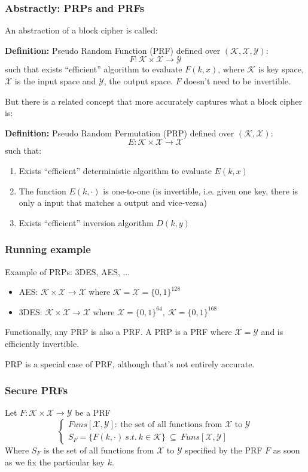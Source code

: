 \documentclass[12pt]{book}
\newcommand{\Def}{\textcolor{dkgreen}{\textbf{Definition:}} }
\begin{document}
\subsubsection{Abstractly: PRPs and PRFs}
An abstraction of a block cipher is called:

\Def Pseudo Random Function (PRF) defined over $(\mathcal{K},\mathcal{X},\mathcal{Y})$:
$$F:\mathcal{K}\times\mathcal{X}\rightarrow\mathcal{Y}$$such that exists ``efficient'' algorithm to evaluate $F(k,x)$, where $\mathcal{K}$ is key space, $\mathcal{X}$ is the input space and $\mathcal{Y}$, the output space. $F$ doesn't need to be invertible.

But there is a related concept that more accurately captures what a block cipher is:

\Def Pseudo Random Permutation (PRP) defined over $(\mathcal{K},\mathcal{X})$:
$$E:\mathcal{K}\times\mathcal{X}\rightarrow\mathcal{X}$$such that:
\begin{enumerate}
	\item Exists ``efficient'' deterministic algorithm to evaluate $E(k,x)$
	\item The function $E(k,\cdot)$ is one-to-one (is invertible, i.e. given one key, there is only a input that matches a output and vice-versa)
	\item Exists ``efficient'' inversion algorithm $D(k,y)$
\end{enumerate}

\subsubsection{Running example}
Example of PRPs: 3DES, AES, ...
\begin{itemize}
	\item[] AES: $\mathcal{K}\times\mathcal{X}\rightarrow\mathcal{X}$ where $\mathcal{K}=\mathcal{X}=\{0,1\}^{128}$
	\item[] 3DES: $\mathcal{K}\times\mathcal{X}\rightarrow\mathcal{X}$ where $\mathcal{X}=\{0,1\}^{64},\ \mathcal{K}=\{0,1\}^{168}$
\end{itemize}

Functionally, any PRP is also a PRF. A PRP is a PRF where $\mathcal{X}=\mathcal{Y}$ and is efficiently invertible.

PRP is a special case of PRF, although that's not entirely accurate.

\subsubsection{Secure PRFs}
Let $F:\mathcal{K}\times\mathcal{X}\rightarrow\mathcal{Y}$ be a PRF
$$\left\{\begin{array}{l}
	Funs[\mathcal{X},\mathcal{Y}]:\ \text{the set of all functions from }\mathcal{X}\text{ to }\mathcal{Y}\\[0.5cm]
	S_{F}=\{F(k,\cdot)\ s.t.\ k\in\mathcal{K}\}\ \subseteq\ Funs[\mathcal{X},\mathcal{Y}]
\end{array}\right.$$
Where $S_{F}$ is the set of all functions from $\mathcal{X}$ to $\mathcal{Y}$ specified by the PRF $F$ as soon as we fix the particular key $k$.
\end{document}
